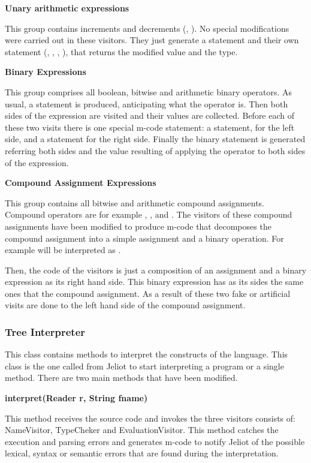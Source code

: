 {\bf{Unary arithmetic expressions}}

This group contains increments and decrements (\p{++}, \p{--}). No
special modifications were carried out in these visitors. They just
generate a  statement and their own statement (, ,
, ), that returns the modified value and the type.

{\bf{Binary Expressions}}

This group comprises all boolean, bitwise and arithmetic binary operators.
As usual, a  statement is produced, anticipating what the operator
is. Then both sides of the expression are visited and their values are
collected. Before each of these two visits there is one special m-code
statement: a  statement, for the left side, and a 
statement for the right side. Finally the binary statement is generated
referring both sides and the value resulting of applying the operator to
both sides of the expression.

{\bf{Compound Assignment Expressions}}

This group contains all bitwise and arithmetic compound assignments.
Compound operators are for example \p{+=}, \p{-=}, \p{*=} and \p{/=}. The visitors of
these compound assignments have been modified to produce m-code that
decomposes the compound assignment into a simple assignment and a binary
operation. For example  will be interpreted as .

Then, the code of the visitors is just a composition of an assignment and
a binary expression as its right hand side. This binary expression has as
its sides the same ones that the compound assignment. As a result of these
two fake or artificial visits are done to the left hand side of the compound assignment.

\subsubsection{Tree Interpreter}

This class contains methods to interpret the constructs of the language.
This class is the one called from Jeliot to start interpreting a program
or a single method. There are two main methods that have been modified.

{\bf{interpret(Reader r, String fname)}}

This method receives the source code and invokes the three visitors
\djava{} consists of: NameVisitor, TypeCheker and EvaluationVisitor.
This method catches the execution and parsing errors and generates m-code
to notify Jeliot of the possible lexical, syntax or semantic errors that
are found during the interpretation.

